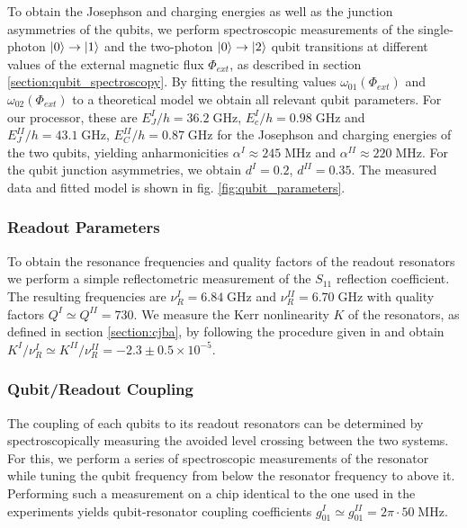 To obtain the Josephson and charging energies as well as the junction asymmetries of the qubits, we perform spectroscopic measurements of the single-photon $\left| 0 \right>\to \left| 1 \right>$ and the two-photon $\left| 0 \right>\to\left| 2 \right>$ qubit transitions at different values of the external magnetic flux $\Phi_{ext}$, as described in section \ref{section:qubit_spectroscopy}. By fitting the resulting values $\omega_{01}(\Phi_{ext})$ and $\omega_{02}(\Phi_{ext})$ to a theoretical model we obtain all relevant qubit parameters. For our processor, these are $E_J^I / h = 36.2\; \mathrm{GHz}$, $E_c^I / h = 0.98 \; \mathrm{GHz}$ and $E_J^{II} / h = 43.1\; \mathrm{GHz}$, $E_C^{II} / h = 0.87 \; \mathrm{GHz}$ for the Josephson and charging energies of the two qubits, yielding anharmonicities $\alpha^I\approx 245\;\mathrm{MHz}$ and $\alpha^{II}\approx 220\;\mathrm{MHz}$. For the qubit junction asymmetries, we obtain $d^I = 0.2$, $d^{II} =  0.35$. The measured data and fitted model is shown in fig. \ref{fig:qubit_parameters}.

\subsubsection{Readout Parameters}

To obtain the resonance frequencies and quality factors of the readout resonators we perform a simple reflectometric measurement of the $S_{11}$ reflection coefficient. The resulting frequencies are $\nu_R^I = 6.84 \; \mathrm{GHz}$ and $\nu_R^{II} = 6.70 \; \mathrm{GHz}$ with quality factors $Q^I \simeq Q^{II} = 730$. We measure the Kerr nonlinearity $K$ of the resonators, as defined in section \ref{section:cjba}, by following the procedure given in \citep[p. 166]{palacios-laloy_superconducting_2010} and obtain $K^I / \nu_R^I \simeq K^{II} / \nu_R^{II} = -2.3\pm 0.5 \times 10^{-5}$.

\subsubsection{Qubit/Readout Coupling}

The coupling of each qubits to its readout resonators can be determined by spectroscopically measuring the avoided level crossing between the two systems. For this, we perform a series of spectroscopic measurements of the resonator while tuning the qubit frequency from below the resonator frequency to above it. Performing such a measurement on a chip identical to the one used in the experiments yields qubit-resonator coupling coefficients $g_{01}^I \simeq g_{01}^{II} = 2\pi\cdot 50 \; \mathrm{MHz}$.


